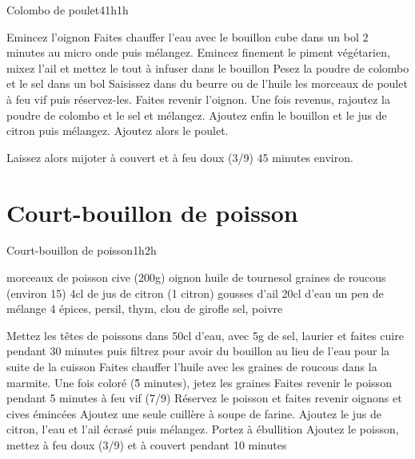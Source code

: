 {\begin{recette}{Colombo de poulet}{4}{1h}{1h}
\begin{preparation}
\etape Emincez l'oignon
\etape Faites chauffer l'eau avec le bouillon cube dans un bol 2 minutes au micro onde puis mélangez. 
\etape Emincez finement le piment végétarien, mixez l'ail et mettez le tout à infuser dans le bouillon
\etape Pesez la poudre de colombo et le sel dans un bol
\etape Saisissez dans du beurre ou de l'huile les morceaux de poulet à feu vif puis réservez-les.
\etape Faites revenir l'oignon.
\etape Une fois revenus, rajoutez la poudre de colombo et le sel et mélangez. 
\etape Ajoutez enfin le bouillon et le jus de citron puis mélangez. Ajoutez alors le poulet.
\end{preparation}

\begin{cuisson}
Laissez alors mijoter à couvert et à feu doux (3/9) 45 minutes environ.
\end{cuisson}
\end{recette}

\section{Court-bouillon de poisson}
\begin{recette}{Court-bouillon de poisson}{}{1h}{2h}
\begin{ingredients}
\ingredient morceaux de poisson
 cive (200g)
 oignon
\ingredient huile de tournesol
\ingredient graines de roucous (environ 15)
\ingredient 4cl de jus de citron (1 citron)
 gousses d'ail
\ingredient 20cl d'eau
\ingredient un peu de mélange 4 épices, persil, thym, clou de girofle
\ingredient sel, poivre
\end{ingredients}

\begin{preparation}
\etape [facultatif] Mettez les têtes de poissons dans 50cl d'eau, avec 5g de sel, laurier et faites cuire pendant 30 minutes puis filtrez pour avoir du bouillon au lieu de l'eau pour la suite de la cuisson
\etape Faites chauffer l'huile avec les graines de roucous dans la marmite. Une fois coloré (\~5 minutes), jetez les graines
\etape Faites revenir le poisson pendant 5 minutes à feu vif (7/9)
\etape Réservez le poisson et faites revenir oignons et cives émincées
\etape Ajoutez une seule cuillère à soupe de farine. Ajoutez le jus de citron, l'eau et l'ail écrasé puis mélangez. 
\etape Portez à ébullition
\etape Ajoutez le poisson, mettez à feu doux (3/9) et à couvert pendant 10 minutes
\end{preparation}
\end{recette}

}
